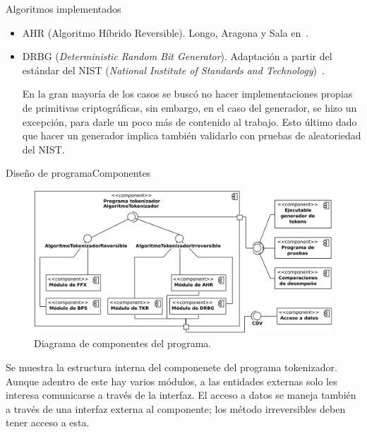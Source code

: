 \begin{frame}{Algoritmos implementados}
\begin{itemize}
\begin{itemize}
        \item<6-> AHR (Algoritmo Híbrido Reversible). Longo, Aragona y Sala
          en~\cite{aragona}.

        \item<7-> DRBG (\textit{Deterministic Random Bit Generator}). Adaptación
          a partir del estándar del NIST (\textit{National Institute of Standards
          and Technology})~\cite{nist_aleatorios}.

          {
            En la gran mayoría de los casos se buscó no hacer implementaciones
            propias de primitivas criptográficas, sin embargo, en el caso del
            generador, se hizo un excepción, para darle un poco más de contenido
            al trabajo. Esto último dado que hacer un generador implica también
            validarlo con pruebas de aleatoriedad del NIST.
          }

      \end{itemize}
  \end{itemize}
\end{frame}

\begin{frame}{Diseño de programa}{Componentes}

  \begin{figure}[H]
    \begin{center}
      \includegraphics[width=1.0\linewidth]
        {../../../diagramas_comunes/disenio/componentes_v2.png}
      \caption{Diagrama de componentes del programa.}
    \end{center}
  \end{figure}

  \note
  {
    Se muestra la estructura interna del componenete del programa
    tokenizador. Aunque adentro de este hay varios módulos, a las entidades
    externas solo les interesa comunicarse a través de la interfaz. El acceso
    a datos se maneja también a través de una interfaz externa al componente;
    los método irreversibles deben tener acceso a esta.
  }

\end{frame}
